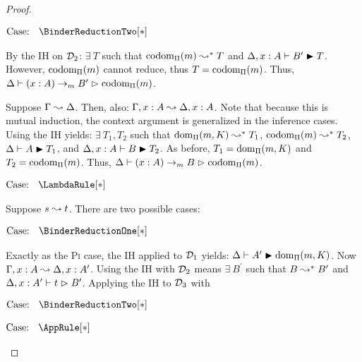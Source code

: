 \begin{proof}
\begin{proofcase}
        $\text{Case: }\begin{array}{c} \BinderReductionTwo[*] \end{array}$
        \begin{proofcase}
            By the IH on $\mathcal{D}_{2}$: $\exists\ T$ such that $\mbox{\normalfont codom}_\Pi(m) \leadsto^* T$ and $\Delta, x : A \vdash B^\prime \blacktriangleright T$.
            However, $\mbox{\normalfont codom}_\Pi(m)$ cannot reduce, thus $T = \mbox{\normalfont codom}_\Pi(m)$.
            Thus, $\Delta \vdash (x : A) \to_m B^\prime \vartriangleright \mbox{\normalfont codom}_\Pi(m)$.
        \end{proofcase}
        Suppose $\Gamma \leadsto \Delta$.
        Then, also: $\Gamma, x : A \leadsto \Delta, x : A$.
        Note that because this is mutual induction, the context argument is generalized in the inference cases.
        Using the IH yields: $\exists\ T_1, T_2$ such that $\mbox{\normalfont dom}_\Pi(m, K) \leadsto^* T_1$, $\mbox{\normalfont codom}_\Pi(m) \leadsto^* T_2$, $\Delta \vdash A \blacktriangleright T_1$, and $\Delta, x : A \vdash B \blacktriangleright T_2$.
        As before, $T_1 = \mbox{\normalfont dom}_\Pi(m, K)$ and $T_2 = \mbox{\normalfont codom}_\Pi(m)$.
        Thus, $\Delta \vdash (x : A) \to_m B \vartriangleright \mbox{\normalfont codom}_\Pi(m)$.
    \end{proofcase}

    $\text{Case: }\begin{array}{c} \LambdaRule[*] \end{array}$
    \begin{proofcase}
        Suppose $s \leadsto t$.
        There are two possible cases:

        $\text{Case: }\begin{array}{c} \BinderReductionOne[*] \end{array}$
        \begin{proofcase}
            Exactly as the \textsc{Pi} case, the IH applied to $\mathcal{D}_{1}$ yields: $\Delta \vdash A^\prime \blacktriangleright \mbox{\normalfont dom}_\Pi(m, K)$.
            Now $\Gamma, x : A \leadsto \Delta, x : A^\prime$.
            Using the IH with $\mathcal{D}_{2}$ means $\exists\ B^\prime$ such that $B \leadsto^* B^\prime$ and $\Delta, x : A^\prime \vdash t \vartriangleright B^\prime$.
            Applying the IH to $\mathcal{D}_{3}$ with
        \end{proofcase}

        $\text{Case: }\begin{array}{c} \BinderReductionTwo[*] \end{array}$
        \begin{proofcase}
        \end{proofcase}
    \end{proofcase}

    $\text{Case: }\begin{array}{c} \AppRule[*] \end{array}$
    \begin{proofcase}
    \end{proofcase}


\end{proof}
